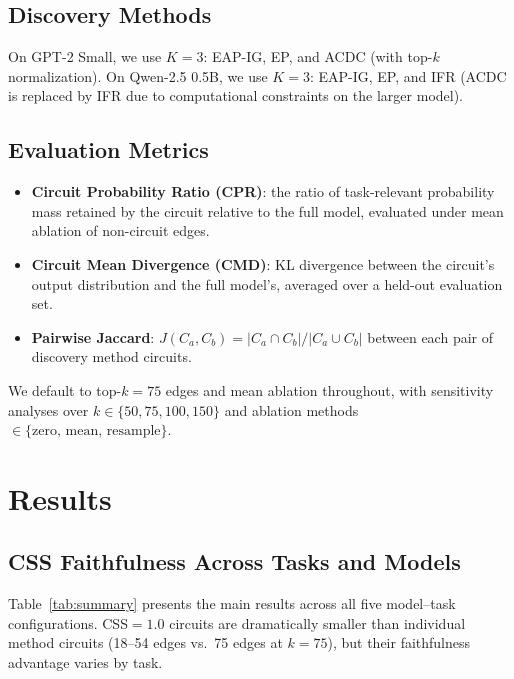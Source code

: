 \documentclass[11pt,a4paper]{article}
\newcommand{\css}{\textsc{CSS}}
\begin{document}
\subsection{Discovery Methods}
On GPT-2 Small, we use $K\!=\!3$: EAP-IG, EP, and ACDC (with top-$k$ normalization).
On Qwen-2.5 0.5B, we use $K\!=\!3$: EAP-IG, EP, and IFR (ACDC is replaced by IFR due to computational constraints on the larger model).

\subsection{Evaluation Metrics}
\begin{itemize}[nosep]
    \item \textbf{Circuit Probability Ratio (CPR)}: the ratio of task-relevant probability mass retained by the circuit relative to the full model, evaluated under mean ablation of non-circuit edges.
    \item \textbf{Circuit Mean Divergence (CMD)}: KL divergence between the circuit's output distribution and the full model's, averaged over a held-out evaluation set.
    \item \textbf{Pairwise Jaccard}: $J(C_a, C_b) = |C_a \cap C_b| / |C_a \cup C_b|$ between each pair of discovery method circuits.
\end{itemize}

We default to top-$k=75$ edges and mean ablation throughout, with sensitivity analyses over $k \in \{50, 75, 100, 150\}$ and ablation methods $\in \{\text{zero, mean, resample}\}$.

\section{Results}
\label{sec:results}

\subsection{CSS Faithfulness Across Tasks and Models}
\label{sec:faithfulness}

Table~\ref{tab:summary} presents the main results across all five model--task configurations.
\css{}$=1.0$ circuits are dramatically smaller than individual method circuits (18--54 edges vs.\ 75 edges at $k\!=\!75$), but their faithfulness advantage varies by task.
\end{document}
